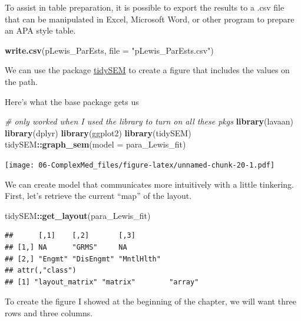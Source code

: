 \documentclass[
  11pt,
]{book}
\newenvironment{Shaded}{\begin{snugshade}}{\end{snugshade}}
\newcommand{\AttributeTok}[1]{\textcolor[rgb]{0.27,0.27,0.27}{#1}}
\newcommand{\CommentTok}[1]{\textcolor[rgb]{0.37,0.37,0.37}{\textit{#1}}}
\newcommand{\FunctionTok}[1]{\textcolor[rgb]{0.27,0.27,0.27}{\textbf{#1}}}
\newcommand{\NormalTok}[1]{#1}
\newcommand{\SpecialCharTok}[1]{\textcolor[rgb]{0.43,0.43,0.43}{\textbf{#1}}}
\newcommand{\StringTok}[1]{\textcolor[rgb]{0.5,0.5,0.5}{#1}}
\begin{document}
To assist in table preparation, it is possible to export the results to a .csv file that can be manipulated in Excel, Microsoft Word, or other program to prepare an APA style table.

\begin{Shaded}
\begin{Highlighting}[]
\FunctionTok{write.csv}\NormalTok{(pLewis\_ParEsts, }\AttributeTok{file =} \StringTok{"pLewis\_ParEsts.csv"}\NormalTok{)}
\end{Highlighting}
\end{Shaded}

We can use the package \href{https://cjvanlissa.github.io/tidySEM/articles/Plotting_graphs.html}{tidySEM} to create a figure that includes the values on the path.

Here's what the base package gets us

\begin{Shaded}
\begin{Highlighting}[]
\CommentTok{\# only worked when I used the library to turn on all these pkgs}
\FunctionTok{library}\NormalTok{(lavaan)}
\FunctionTok{library}\NormalTok{(dplyr)}
\FunctionTok{library}\NormalTok{(ggplot2)}
\FunctionTok{library}\NormalTok{(tidySEM)}
\NormalTok{tidySEM}\SpecialCharTok{::}\FunctionTok{graph\_sem}\NormalTok{(}\AttributeTok{model =}\NormalTok{ para\_Lewis\_fit)}
\end{Highlighting}
\end{Shaded}

\texttt{[image: 06-ComplexMed\_files/figure-latex/unnamed-chunk-20-1.pdf]}

We can create model that communicates more intuitively with a little tinkering. First, let's retrieve the current ``map'' of the layout.

\begin{Shaded}
\begin{Highlighting}[]
\NormalTok{tidySEM}\SpecialCharTok{::}\FunctionTok{get\_layout}\NormalTok{(para\_Lewis\_fit)}
\end{Highlighting}
\end{Shaded}

\begin{verbatim}
##      [,1]    [,2]       [,3]      
## [1,] NA      "GRMS"     NA        
## [2,] "Engmt" "DisEngmt" "MntlHlth"
## attr(,"class")
## [1] "layout_matrix" "matrix"        "array"
\end{verbatim}

To create the figure I showed at the beginning of the chapter, we will want three rows and three columns.
\end{document}
